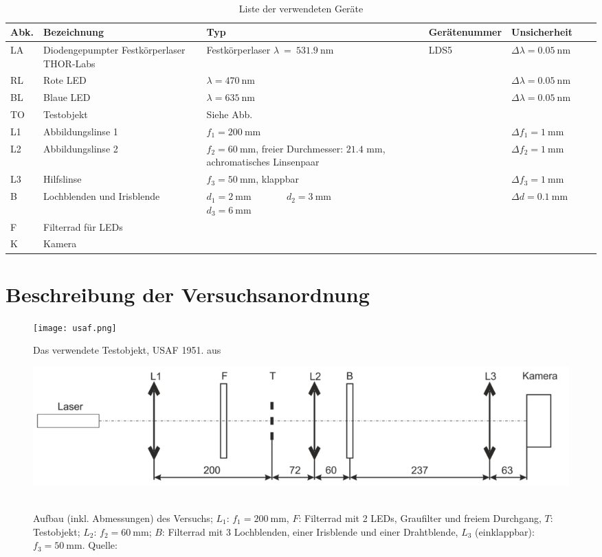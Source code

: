 \documentclass{article}
\begin{document}
\begin{table}[H]
\caption{Liste der verwendeten Geräte}

~

\begin{tabular}{l|p{3cm}p{3cm}llll}
Abk. & Bezeichnung  & Typ & Gerätenummer & Unsicherheit \\
\hline
LA & Diodenge\-pumpter Festkörperlaser THOR-Labs  & Festkörperlaser $\lambda~=~531.9~$nm & LDS5 & $\Delta \lambda = 0.05~$nm \\
\hline
RL & Rote LED &  $\lambda=470~$nm & & $\Delta \lambda = 0.05~$nm \\
\hline
BL & Blaue LED &  $\lambda=635~$nm & & $\Delta \lambda = 0.05~$nm \\
\hline
TO & Testobjekt & Siehe Abb. \\
\hline
L1 & Abbildungslinse 1 & $f_1 = 200~$mm & & $\Delta f_1 = 1~$mm \\
\hline
L2 & Abbildungslinse 2 & $f_2= 60~$mm, freier Durchmesser: $21.4$ mm, achromatisches Linsenpaar & & $\Delta f_2 = 1~$mm\\
\hline
L3 & Hilfslinse & $f_3 = 50~$mm, klappbar & & $\Delta f_3 = 1~$mm \\
\hline
B & Lochblenden und Irisblende & $d_1=2~$mm ~ ~ ~ ~ $d_2=3~$mm   ~~~~~~~~~~~~ $d_3=6~$mm & &  $\Delta d = 0.1~$mm \\
\hline
F & Filterrad für LEDs & \\
\hline
K & Kamera
\end{tabular}

\end{table}



\section{Beschreibung der Versuchsanordnung}

\begin{figure}[H]
\caption{Das verwendete Testobjekt, USAF 1951. aus \cite{quelle6}}
\label{fig:usaf}
{\centering
\texttt{[image: usaf.png]}
~
}
\end{figure}


\begin{figure}[H]
\caption{Aufbau (inkl. Abmessungen) des Versuchs; $L_1$: $f_1= 200~$mm, $F$: Filterrad mit 2 LEDs, Graufilter und freiem Durchgang, $T$: Testobjekt; $L_2$: $f_2= 60~$mm; $B$: Filterrad mit 3 Lochblenden, einer Irisblende und einer Drahtblende, $L_3$ (einklappbar): $f_3= 50~$mm. Quelle: \cite{quelle6}}
\label{fig:usaf}
{\centering
\includegraphics[scale=1]{versuch.png}
~
}
\end{figure}
\end{document}
